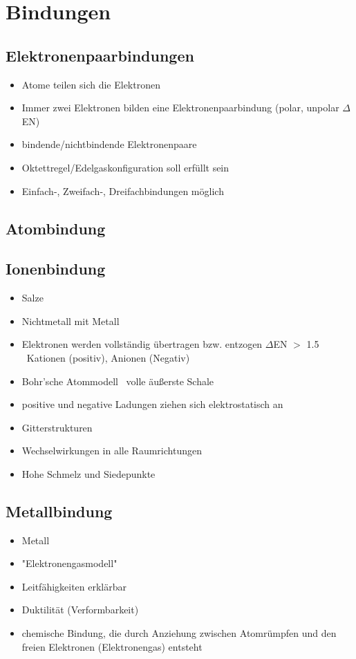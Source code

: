 
\section{Bindungen}

\subsection{Elektronenpaarbindungen}
\begin{itemize}
    \item Atome teilen sich die Elektronen
    \item Immer zwei Elektronen bilden eine Elektronenpaarbindung (polar, unpolar $\Delta$EN)
    \item bindende/nichtbindende Elektronenpaare
    \item Oktettregel/Edelgaskonfiguration soll erfüllt sein
    \item Einfach-, Zweifach-, Dreifachbindungen möglich
\end{itemize}

\subsection{Atombindung}

\subsection{Ionenbindung}
\begin{itemize}
    \item Salze
    \item Nichtmetall mit Metall
    \item Elektronen werden vollständig übertragen bzw. entzogen $\Delta$EN $>$ 1.5 \\
        \textrightarrow\ Kationen (positiv), Anionen (Negativ)
    \item Bohr'sche Atommodell \textrightarrow\ volle äußerste Schale
    \item positive und negative Ladungen ziehen sich elektrostatisch an
    \item Gitterstrukturen
    \item Wechselwirkungen in alle Raumrichtungen
    \item Hohe Schmelz und Siedepunkte
\end{itemize}

\subsection{Metallbindung}
\begin{itemize}
    \item Metall
    \item "Elektronengasmodell"
    \item Leitfähigkeiten erklärbar
    \item Duktilität (Verformbarkeit)
    \item chemische Bindung, die durch Anziehung zwischen Atomrümpfen und den freien Elektronen (Elektronengas) entsteht
\end{itemize}

